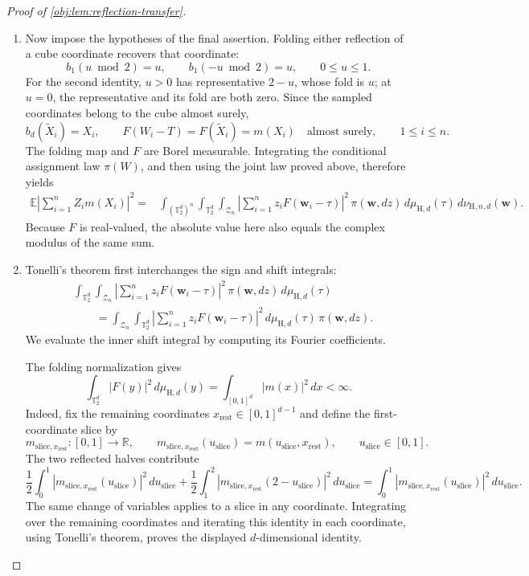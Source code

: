 \begin{proof}[Proof of \cref{obj:lem:reflection-transfer}]
\begin{enumerate}
\item Now impose the hypotheses of the final assertion. Folding either
reflection of a cube coordinate recovers that coordinate:
\[
b_1(u\bmod2)=u,
\qquad
b_1(-u\bmod2)=u,
\qquad 0\leq u\leq1.
\]
For the second identity, \(u>0\) has representative \(2-u\), whose fold
is \(u\); at \(u=0\), the representative and its fold are both zero.
Since the sampled coordinates belong to the cube almost surely,
\[
b_d(\widetilde X_i)=X_i,
\qquad
F(W_i-T)=F(\widetilde X_i)=m(X_i)
\quad\text{almost surely},\qquad 1\leq i\leq n.
\]
The folding map and \(F\) are Borel measurable. Integrating the
conditional assignment law \(\pi(W)\), and then using the joint law
proved above, therefore yields
\[
\begin{aligned}
\mathbb E\left|\sum_{i=1}^n Z_i m(X_i)\right|^2
={}&
\int_{(\mathbb T_2^d)^n}\int_{\mathbb T_2^d}
\int_{\mathcal Z_n}
\left|\sum_{i=1}^n z_i F(\mathbf w_i-\tau)\right|^2
\,\pi(\mathbf w,dz)\,
d\mu_{\mathrm H,d}(\tau)\,
d\nu_{\mathrm H,n,d}(\mathbf w).
\end{aligned}
\]
Because \(F\) is real-valued, the absolute value here also equals the
complex modulus of the same sum.

\item Tonelli's theorem first interchanges the sign and shift integrals:
\[
\begin{aligned}
&\int_{\mathbb T_2^d}\int_{\mathcal Z_n}
\left|\sum_{i=1}^n z_i F(\mathbf w_i-\tau)\right|^2
\,\pi(\mathbf w,dz)\,d\mu_{\mathrm H,d}(\tau)\\
&\qquad=
\int_{\mathcal Z_n}\int_{\mathbb T_2^d}
\left|\sum_{i=1}^n z_i F(\mathbf w_i-\tau)\right|^2
\,d\mu_{\mathrm H,d}(\tau)\,\pi(\mathbf w,dz).
\end{aligned}
\]
We evaluate the inner shift integral by computing its Fourier
coefficients.

The folding normalization gives
\[
\int_{\mathbb T_2^d}|F(y)|^2\,d\mu_{\mathrm H,d}(y)
=\int_{[0,1]^d}|m(x)|^2\,dx<\infty.
\]
Indeed, fix the remaining coordinates
\(x_{\mathrm{rest}}\in[0,1]^{d-1}\) and define the first-coordinate slice by
\[
m_{\mathrm{slice},x_{\mathrm{rest}}}:[0,1]\to\mathbb R,
\qquad
m_{\mathrm{slice},x_{\mathrm{rest}}}(u_{\mathrm{slice}})
=m(u_{\mathrm{slice}},x_{\mathrm{rest}}),
\qquad u_{\mathrm{slice}}\in[0,1].
\]
The two reflected halves contribute
\[
\frac12\int_0^1
|m_{\mathrm{slice},x_{\mathrm{rest}}}(u_{\mathrm{slice}})|^2
\,du_{\mathrm{slice}}
+\frac12\int_1^2
|m_{\mathrm{slice},x_{\mathrm{rest}}}(2-u_{\mathrm{slice}})|^2
\,du_{\mathrm{slice}}
=\int_0^1
|m_{\mathrm{slice},x_{\mathrm{rest}}}(u_{\mathrm{slice}})|^2
\,du_{\mathrm{slice}}.
\]
The same change of variables applies to a slice in any coordinate.
Integrating over the remaining coordinates and iterating this identity
in each coordinate, using Tonelli's theorem, proves the displayed
\(d\)-dimensional identity.


\end{enumerate}
\end{proof}
